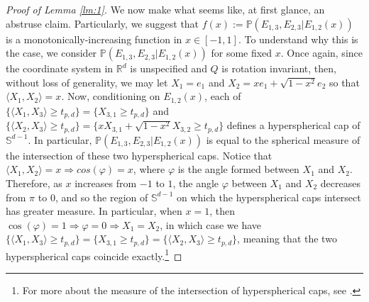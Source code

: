 \documentclass{article}
\begin{document}
\begin{proof}[Proof of Lemma \ref{lm:1}]
We now make what seems like, at first glance, an abstruse claim. Particularly, we suggest that $f(x) := \mathbb{P}(E_{1, 3}, E_{2, 3} | E_{1,2}(x))$ is a monotonically-increasing function in $x \in [-1, 1]$. To understand why this is the case, we consider  $\mathbb{P}(E_{1, 3}, E_{2, 3} | E_{1,2}(x))$ for some fixed $x$. 
Once again, since the coordinate system in $\mathbb{R}^d$ is unspecified and $Q$ is rotation invariant, then, without loss of generality, we may let $X_1 = e_1$ and $X_2 = xe_1 + \sqrt{1 -x^2}e_2$ so that $\langle X_1, X_2 \rangle  = x$. Now, conditioning on $E_{1,2}(x)$, each of $\{ \langle X_1, X_3 \rangle \geq t_{p,d} \} = \{ X_{3,1} \geq t_{p,d} \}$ and $\{ \langle X_2, X_3 \rangle \geq t_{p,d} \} = \{ xX_{3,1} + \sqrt{1-x^2}X_{3,2} \geq t_{p,d} \}$ defines a hyperspherical cap of $\mathbb{S}^{d-1}$. In particular, $\mathbb{P}(E_{1, 3}, E_{2, 3} | E_{1,2}(x))$ is equal to the spherical measure of the intersection of these two hyperspherical caps. Notice that $\langle X_1, X_2 \rangle = x \Rightarrow cos(\varphi) = x$, where $\varphi$ is the angle formed between $X_1$ and $X_2$. Therefore, as $x$ increases from $-1$ to $1$, the angle $\varphi$ between $X_1$ and $X_2$ decreases from $\pi$ to $0$, and so the region of $\mathbb{S}^{d-1}$ on which the hyperspherical caps intersect has greater measure. In particular, when $x = 1$, then $\cos(\varphi) = 1 \Rightarrow \varphi = 0 \Rightarrow X_1 = X_2$, in which case we have $\{ \langle X_1, X_3 \rangle \geq t_{p,d} \} = \{ X_{3,1} \geq t_{p,d} \} = \{ \langle X_2, X_3 \rangle \geq t_{p,d} \}$, meaning that the two hyperspherical caps coincide exactly.\footnote{For more about the measure of the intersection of hyperspherical caps, see \cite{lee2014concise}.}


\end{proof}
\end{document}
